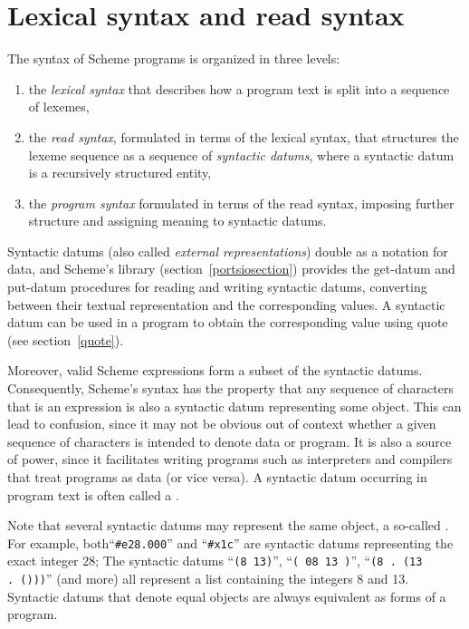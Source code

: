 \chapter{Lexical syntax and read syntax}
\label{readsyntaxchapter}

The syntax of Scheme programs is organized in three levels:
%
\begin{enumerate}
\item the \textit{lexical syntax} that describes how a program text is split
  into a sequence of lexemes,
\item the \textit{read syntax}, formulated in terms of the lexical
  syntax, that structures the lexeme sequence as a sequence of
  \textit{syntactic datums}, where a syntactic datum is
    a recursively structured entity,
\item the \textit{program syntax} formulated in terms of the read
  syntax, imposing further structure and assigning meaning to
  syntactic datums.
\end{enumerate}
%
Syntactic datums (also called \textit{external
  representations}) double
as a notation for data, and Scheme's  library
(section~\ref{portsiosection})
provides the {\cf get-datum} and {\cf put-datum} procedures
for reading and writing syntactic datums, converting between their
textual representation and the corresponding values. 
A
syntactic datum can be used in a program to obtain the corresponding
value using {\cf quote} (see section~\ref{quote}).

Moreover, valid Scheme expressions form a subset of the syntactic datums.
Consequently, Scheme's syntax has the property that any sequence of
characters that is an expression is also a syntactic datum representing
some object.  This can lead to confusion, since it may not be obvious
out of context whether a given sequence of characters is intended to
denote data or program. It is also a source of power, since it
facilitates writing programs such as interpreters and compilers that
treat programs as data (or vice versa).
A syntactic datum occurring in program text is often called a .

Note that several syntactic datums may represent the same object, a
so-called .
For example, both``{\tt \#e28.000}'' and
``{\tt\#x1c}'' are syntactic datums representing the exact integer 28;
The syntactic datums ``{\tt(8 13)}'', ``{\tt( 08 13 )}'', ``{\tt(8 .\
  (13 .\ ()))}'' (and more)
all represent a list containing the integers 8 and 13. 
Syntactic datums that denote equal objects are always equivalent 
as forms of a program.

